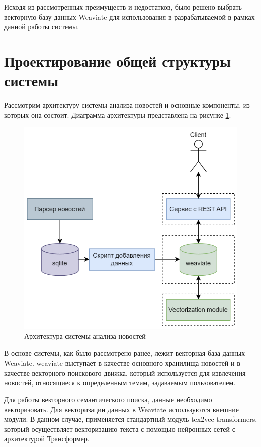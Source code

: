 Исходя из рассмотренных преимуществ и недостатков, было решено выбрать векторную базу данных Weaviate для использования в разрабатываемой в рамках данной работы системы.

\section{Проектирование общей структуры системы}

Рассмотрим архитектуру системы анализа новостей и основные компоненты, из которых она состоит. Диаграмма архитектуры представлена на рисунке \ref{img:system-architecture}.

\begin{figure}[h]
    \centering
    \includegraphics{images/system-architecture.png}
    \caption{Архитектура системы анализа новостей}
    \label{img:system-architecture}
\end{figure}

В основе системы, как было рассмотрено ранее, лежит векторная база данных Weaviate. weaviate выступает в качестве основного хранилища новостей и в качестве векторного поискового движка, который используется для извлечения новостей, относящиеся к определенным темам, задаваемым пользователем.

Для работы векторного семантического поиска, данные необходимо векторизовать. Для векторизации данных в Weaviate используются внешние модули. В данном случае, применяется стандартный модуль tex2vec-transformers, который осуществляет векторизацию текста с помощью нейронных сетей с архитектурой Трансформер.

